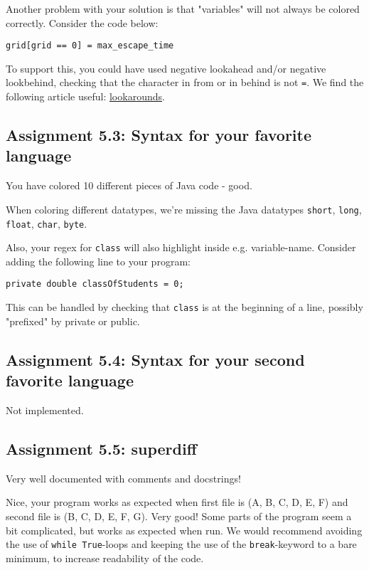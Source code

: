 \documentclass[a4paper]{article}
\begin{document}
Another problem with your solution is that "variables" will not always be colored correctly. Consider the code below:

\begin{verbatim}
grid[grid == 0] = max_escape_time
\end{verbatim}

To support this, you could have used negative lookahead and/or negative lookbehind, checking that the character in from or in behind is not \texttt{=}. We find the following article useful:  \underline{\href{http://www.regular-expressions.info/lookaround.html}{lookarounds}}.


\subsection*{Assignment 5.3: Syntax for your favorite language}
You have colored 10 different pieces of Java code - good.

When coloring different datatypes, we're missing the Java datatypes \texttt{short}, \texttt{long}, \texttt{float}, \texttt{char}, \texttt{byte}. 

Also, your regex for \texttt{class} will also highlight inside e.g. variable-name. Consider adding the following line to your program:

\begin{verbatim}
private double classOfStudents = 0;
\end{verbatim}

This can be handled by checking that \texttt{class} is at the beginning of a line, possibly "prefixed" by private or public.

\subsection*{Assignment 5.4: Syntax for your second favorite language}
Not implemented. 

\subsection*{Assignment 5.5: superdiff}
Very well documented with comments and docstrings!

Nice, your program works as expected when first file is (A, B, C, D, E, F) and second file is (B, C, D, E, F, G). Very good! Some parts of the program seem a bit complicated, but works as expected when run. We would recommend avoiding the use of \texttt{while True}-loops and keeping the use of the \texttt{break}-keyword to a bare minimum, to increase readability of the code.
\end{document}
